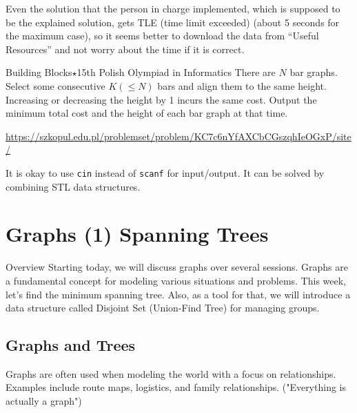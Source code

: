 Even the solution that the person in charge implemented, which is supposed to be the explained solution, gets TLE (time limit exceeded) (about 5 seconds for the maximum case), so it seems better to download the data from ``Useful Resources'' and not worry about the time if it is correct.

\begin{pbox}{Building Blocks$\star$}{15th Polish Olympiad in Informatics}
There are $N$ bar graphs. Select some consecutive $K (\le N)$ bars and align them to the same height.
Increasing or decreasing the height by 1 incurs the same cost. Output the minimum total cost and the height of each bar graph at that time.

\url{https://szkopul.edu.pl/problemset/problem/KC7c6nYfAXCbCGszqhIeOGxP/site/}
\end{pbox}

It is okay to use \texttt{cin} instead of \texttt{scanf} for input/output. It can be solved by combining STL data structures.

\chapter{Graphs (1) Spanning Trees}

\begin{itembox}[l]{Overview}
Starting today, we will discuss graphs over several sessions. Graphs are a fundamental concept for modeling various situations and problems.
This week, let's find the minimum spanning tree. Also, as a tool for that, we will introduce a data structure called Disjoint Set (Union-Find Tree) for managing groups.
\end{itembox}
\section{Graphs and Trees}

Graphs are often used when modeling the world with a focus on relationships.
Examples include route maps, logistics, and family relationships.
(\pccbook[Sections 2-5, p.~87] "Everything is actually a graph")

\begin{center}
\end{center}
